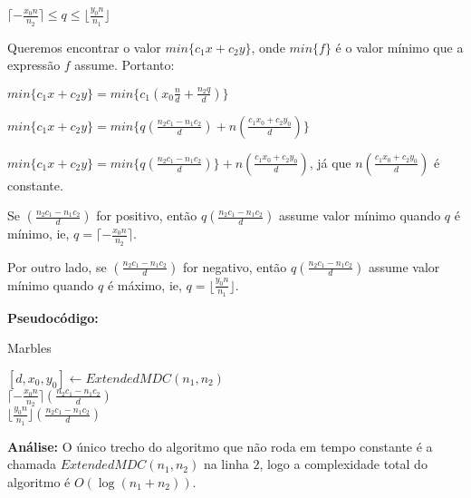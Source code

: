 $\lceil -\frac{x_0n}{n_2} \rceil \leq q \leq \lfloor \frac{y_0n}{n_1} \rfloor$
\newline

Queremos encontrar o valor $min\{c_1x+c_2y\}$, onde $min\{f\}$ é o valor mínimo que a expressão $f$ assume. Portanto:
\newline

$min\{c_1x+c_2y\} = min\big\{c_1(x_0\frac{n}{d} + \frac{n_2q}{d})\big\}$ 
\newline

$min\{c_1x+c_2y\} = min\big\{q(\frac{n_2c_1 - n_1c_2}{d}) + n(\frac{c_1x_0+c_2y_0}{d})\big\}$ 
\newline

$min\{c_1x+c_2y\} = min\big\{q(\frac{n_2c_1 - n_1c_2}{d})\big\} + n(\frac{c_1x_0+c_2y_0}{d})$, já que $n(\frac{c_1x_0+c_2y_0}{d})$ é constante. 
\newline

Se $(\frac{n_2c_1 - n_1c_2}{d})$ for positivo, então $q(\frac{n_2c_1 - n_1c_2}{d})$ assume valor mínimo quando $q$ é mínimo, ie, $q=\lceil -\frac{x_0n}{n_2} \rceil$.

Por outro lado, se $(\frac{n_2c_1 - n_1c_2}{d})$ for negativo, então $q(\frac{n_2c_1 - n_1c_2}{d})$ assume valor mínimo quando $q$ é máximo, ie, $q=\lfloor \frac{y_0n}{n_1} \rfloor$.
\newline

\textbf{Pseudocódigo:}
\begin{algorithm}
\caption{Marbles}
\begin{algorithmic}[1]

\State $[d,x_0,y_0] \gets ExtendedMDC(n_1,n_2)$
\\
\State \Return $\lceil -\frac{x_0n}{n_2} \rceil (\frac{n_2c_1 - n_1c_2}{d})$
\\
\Else
\State \Return $\lfloor \frac{y_0n}{n_1} \rfloor (\frac{n_2c_1 - n_1c_2}{d})$
\EndIf
\EndProcedure
\end{algorithmic}
\end{algorithm}
\newline

\textbf{Análise:}
O único trecho do algoritmo que não roda em tempo constante é a chamada $ExtendedMDC(n_1,n_2)$ na linha $2$, logo a complexidade total do algoritmo é $O(\log(n_1+n_2))$.
\newline




